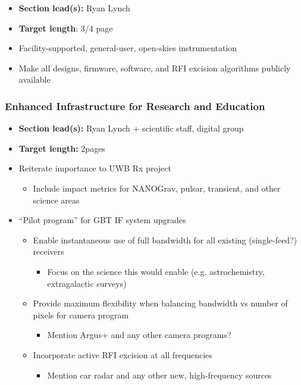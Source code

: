 \documentclass[10pt]{NSF}
\begin{document}
\begin{itemize}
\item{\textbf{Section lead(s):} Ryan Lynch}
\item{\textbf{Target length}: 3/4 page}
\item{Facility-supported, general-user, open-skies instrumentation}
\item{Make all designs, firmware, software, and RFI excision
    algorithms publicly available}
\end{itemize}

\subsubsection{Enhanced Infrastructure for Research and Education}
\label{sec:infrastructure}

\begin{itemize}
\item{\textbf{Section lead(s):} Ryan Lynch + scientific staff, digital
    group}
\item{\textbf{Target length:} 2pages}
\item{Reiterate importance to UWB Rx project}
  \begin{itemize}
  \item{Include impact metrics for NANOGrav, pulsar, transient, and
      other science areas}
  \end{itemize}
\item{``Pilot program'' for GBT IF system upgrades}
  \begin{itemize}
  \item{Enable instantaneous use of full bandwidth for all existing
      (single-feed?) receivers}
    \begin{itemize}
    \item{Focus on the science this would enable (e.g. astrochemistry,
        extragalactic surveys)}
    \end{itemize}
  \item{Provide maximum flexibility when balancing bandwidth vs number
      of pixels for camera program}
    \begin{itemize}
    \item{Mention Argus+ and any other camera programs?}
    \end{itemize}
  \item{Incorporate active RFI excision at all frequencies}
    \begin{itemize}
    \item{Mention car radar and any other new, high-frequency sources
}
\end{itemize}
\end{itemize}
\end{itemize}
\end{document}
